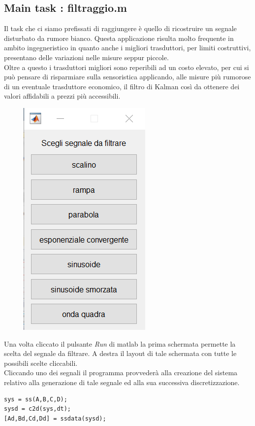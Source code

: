 \subsection{Main task : filtraggio.m}
Il task che ci siamo prefissati di raggiungere è quello di ricostruire un segnale disturbato da rumore bianco. Questa applicazione risulta molto frequente in ambito ingegneristico in quanto anche i migliori trasduttori, per limiti costruttivi, presentano delle variazioni nelle misure seppur piccole.\\
Oltre a questo i trasduttori migliori sono reperibili ad un costo elevato, per cui si può pensare di risparmiare sulla sensoristica applicando, alle misure più rumorose di un eventuale trasduttore economico, il filtro di Kalman così da ottenere dei valori affidabili a prezzi più accessibili.
\\
\begin{figure}
\centering
\includegraphics[scale=.7]{immaginiMain/mainfilterPOSS.png} 
\end{figure}
Una volta cliccato il pulsante \textit{Run} di matlab la prima schermata permette la scelta del segnale da filtrare.
A destra il layout di tale schermata con tutte le possibili scelte cliccabili.\\
Cliccando uno dei segnali il programma provvederà alla creazione del sistema relativo alla generazione di tale segnale ed alla sua successiva discretizzazione.
\begin{lstlisting}[frame=single]
sys = ss(A,B,C,D);
sysd = c2d(sys,dt); 
[Ad,Bd,Cd,Dd] = ssdata(sysd);
\end{lstlisting}
